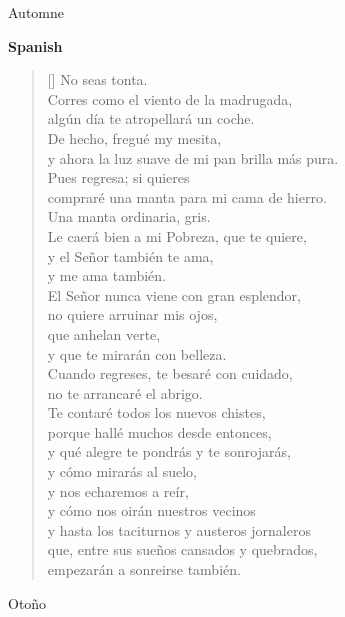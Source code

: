 \documentclass[a4paper,12pt,twoside,final]{book}
\begin{document}
Automne

\newpage


\noindent \textbf{Spanish}


\settowidth{\versewidth}{y ahora la luz suave de mi pan brilla más pura.}

\begin{verse}[\versewidth]
  No seas tonta. \\
  Corres como el viento de la madrugada, \\
  algún día te atropellará un coche. \\
  De hecho, fregué my mesita, \\
  y ahora la luz suave de mi pan brilla más pura. \\
  Pues regresa; si quieres \\
  compraré una manta para mi cama de hierro. \\
  Una manta ordinaria, gris. \\
  Le caerá bien a mi Pobreza, que te quiere, \\
  y el Señor también te ama, \\
  y me ama también. \\
  El Señor nunca viene con gran esplendor, \\
  no quiere arruinar mis ojos, \\
  que anhelan verte, \\
  y que te mirarán con belleza. \\
  Cuando regreses, te besaré con cuidado, \\
  no te arrancaré el abrigo. \\
  Te contaré todos los nuevos chistes, \\
  porque hallé muchos desde entonces, \\
  y qué alegre te pondrás y te sonrojarás, \\
  y cómo mirarás al suelo, \\
  y nos echaremos a reír, \\
  y cómo nos oirán nuestros vecinos \\
  y hasta los taciturnos y austeros jornaleros \\
  que, entre sus sueños cansados y quebrados, \\
  empezarán a sonreirse también. \\
\end{verse}

Otoño
\end{document}
